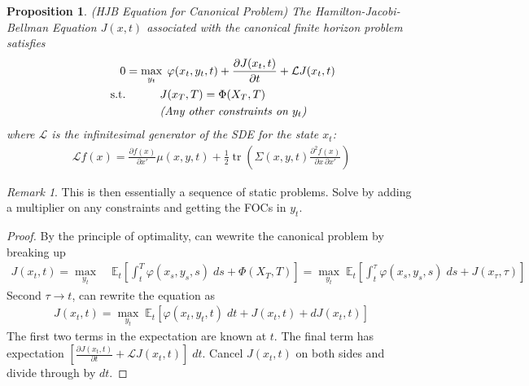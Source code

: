 \documentclass[12pt]{article}
\numberwithin{equation}{section} %
\theoremstyle{plain}
\newtheorem{prop}[thm]{Proposition}
\theoremstyle{definition}
\theoremstyle{remark}
\newtheorem*{rmk}{Remark}
\newcommand{\ra}{\rightarrow}
\newcommand{\trace}{\operatorname{tr}}
\newcommand{\calL}{\mathcal{L}}
\newcommand{\E}{\mathbb{E}}
\begin{document}
\begin{prop}\emph{(HJB Equation for Canonical Problem)}
The \emph{Hamilton-Jacobi-Bellman Equation} $J(x,t)$ associated with the
canonical finite horizon problem satisfies
\begin{align*}
  0
  &=
  \max_{y_t}
  \;
  \varphi(x_t,y_t,t)
  +
  \frac{\partial J(x_t,t)}{\partial t}
  +
  \calL J(x_t,t)
  \\
  \qquad\text{s.t.}
  &
  \quad\qquad
  J(x_T,T)=\Phi(X_T,T)
  \\
  &
  \quad\qquad
  \text{\emph{(Any other constraints on $y_t$)}}
\end{align*}
where $\calL$ is the infinitesimal generator of the SDE for the state
$x_t$:
\begin{align*}
  \calL f(x)
  =
  \frac{\partial f(x)}{\partial x'}
  \mu(x,y,t)
  +
  \frac{1}{2}
  \trace\left(
  \Sigma(x,y,t)
  \frac{\partial^2 f(x)}{\partial x\,\partial x'}
  \right)
\end{align*}
\end{prop}
\begin{rmk}
This is then essentially a sequence of static problems.
Solve by adding a multiplier on any constraints and getting the FOCs in
$y_t$.
\end{rmk}
\begin{proof}
By the principle of optimality, can wewrite the canonical problem by
breaking up
\begin{align*}
  J(x_t,t)
  =
  \max_{y_t}
  \;&
  \E_t\left[
    \int_t^T
    \varphi(x_s,y_s,s)\;ds
    +
    \Phi(X_T,T)
  \right]
  =
  \max_{y_t}
  \;
  \E_t\left[
    \int_t^\tau
    \varphi(x_s,y_s,s)\;ds
    +
    J(x_\tau,\tau)
  \right]
\end{align*}
Second $\tau\ra t$, can rewrite the equation as
\begin{align*}
  J(x_t,t)
  =
  \max_{y_t}
  \;
  \E_t\left[
    \varphi(x_t,y_t,t)\;dt
    +
    J(x_t,t)
    +
    dJ(x_t,t)
  \right]
\end{align*}
The first two terms in the expectation are known at $t$. The final term
has expectation
$\left[\frac{\partial J(x_t,t)}{\partial t}+\calL J(x_t,t)\right]\;dt$.
Cancel $J(x_t,t)$ on both sides and divide through by $dt$.
\end{proof}
\end{document}

